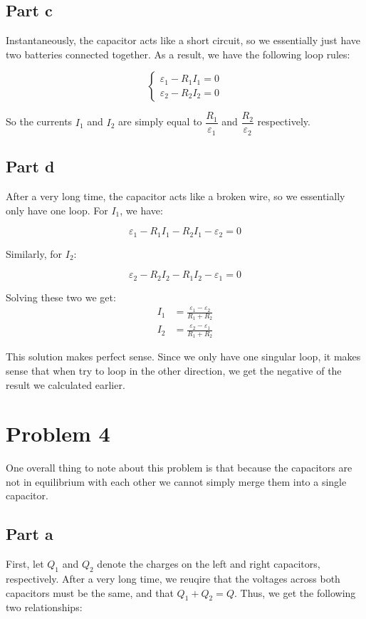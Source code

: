 \documentclass{article}
\theoremstyle{definition}
\numberwithin{equation}{section}
\numberwithin{definition}{section}
\begin{document}
\subsection{Part c}

Instantaneously, the capacitor acts like a short circuit, so we essentially just have two batteries connected together. As a result, we have the following loop rules:

\[\begin{cases}
    \varepsilon_1 - R_1 I_1 = 0\\
    \varepsilon_2 - R_2 I_2 = 0
\end{cases}\]

So the currents $I_1$ and $I_2$ are simply equal to $\dfrac{R_1}{\varepsilon_1}$ and $\dfrac{R_2}{\varepsilon_2}$ respectively.

\subsection{Part d}

After a very long time, the capacitor acts like a broken wire, so we essentially only have one loop. For $I_1$, we have:

\[ \varepsilon_1 - R_1 I_1 - R_2 I_1 - \varepsilon_2 = 0\]

Similarly, for $I_2$:

\[ \varepsilon_2 - R_2 I_2 - R_1 I_2 - \varepsilon_1 = 0\]

Solving these two we get:
\begin{align*}
    I_1 &= \frac{\varepsilon_1 - \varepsilon_2}{R_1 + R_2}\\
    I_2 &= \frac{\varepsilon_2 - \varepsilon_1}{R_1 + R_2}
\end{align*}

This solution makes perfect sense. Since we only have one singular loop, it makes sense that when try to loop in the other direction, we get the negative of the result we calculated earlier. 



\section{Problem 4}
One overall thing to note about this problem is that because the capacitors are not in equilibrium with each other we cannot simply merge them into a single capacitor. 
\subsection{Part a}
First, let $Q_1$ and $Q_2$ denote the charges on the left and right capacitors, respectively. After a very long time, we reuqire that the voltages across both capacitors must be the same, and that $Q_1 + Q_2 = Q$. Thus, we get the following two relationships:
\end{document}
